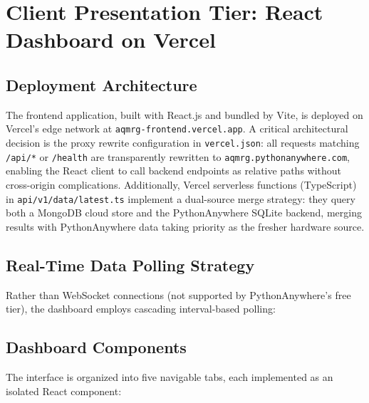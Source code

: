 \figMethodologyMlpipeline

\figMethodologyEnsembleLogic

\section{Client Presentation Tier: React Dashboard on Vercel}

\subsection{Deployment Architecture}
The frontend application, built with React.js and bundled by Vite, is deployed on Vercel's edge network at \texttt{aqmrg-frontend.vercel.app}. A critical architectural decision is the proxy rewrite configuration in \texttt{vercel.json}: all requests matching \texttt{/api/*} or \texttt{/health} are transparently rewritten to \texttt{aqmrg.pythonanywhere.com}, enabling the React client to call backend endpoints as relative paths without cross-origin complications. Additionally, Vercel serverless functions (TypeScript) in \texttt{api/v1/data/latest.ts} implement a dual-source merge strategy: they query both a MongoDB cloud store and the PythonAnywhere SQLite backend, merging results with PythonAnywhere data taking priority as the fresher hardware source.

\figMethodologyComponentTree

\subsection{Real-Time Data Polling Strategy}
Rather than WebSocket connections (not supported by PythonAnywhere's free tier), the dashboard employs cascading interval-based polling:

\tabMethodologyPolling

\figMethodologyPollFsm

\subsection{Dashboard Components}
The interface is organized into five navigable tabs, each implemented as an isolated React component:

